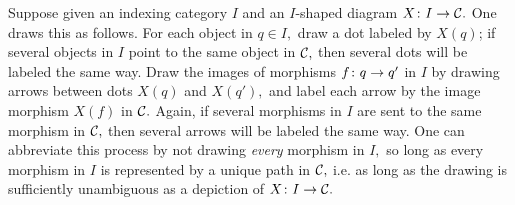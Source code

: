 \documentclass[../main/CT4S-EN-RU]{subfiles}
\begin{document}
\begin{definitionRUS}
\end{definitionRUS}

\begin{blockENG}
Suppose given an indexing category $I$ and an $I$-shaped diagram $X\colon I\rightarrow\mathcal{C}.$ One draws this as follows. For each object in $q\in I,$ draw a dot labeled by $X(q)$; if several objects in $I$ point to the same object in $\mathcal{C},$ then several dots will be labeled the same way. Draw the images of morphisms $f\colon q\rightarrow q'$ in $I$ by drawing arrows between dots $X(q)$ and $X(q'),$ and label each arrow by the image morphism $X(f)$ in $\mathcal{C}.$ Again, if several morphisms in $I$ are sent to the same morphism in $\mathcal{C},$ then several arrows will be labeled the same way. One can abbreviate this process by not drawing {\em every} morphism in $I,$ so long as every morphism in $I$ is represented by a unique path in $\mathcal{C},$ i.e. as long as the drawing is sufficiently unambiguous as a depiction of $X\colon I\rightarrow\mathcal{C}.$
\end{blockENG}

\begin{blockRUS}
\end{blockRUS}
\end{document}
